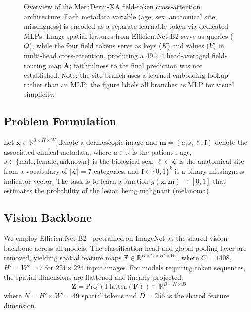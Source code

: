 \documentclass[12pt, a4paper]{article}
\newcommand{\R}{\mathbb{R}}
\begin{document}
\begin{figure}[htbp]
{%
        }
    \caption{Overview of the MetaDerm-XA field-token cross-attention architecture. Each metadata variable (age, sex, anatomical site, missingness) is encoded as a separate learnable token via dedicated MLPs. Image spatial features from EfficientNet-B2 serve as queries ($Q$), while the four field tokens serve as keys ($K$) and values ($V$) in multi-head cross-attention, producing a $49 \times 4$ head-averaged field-routing map $\bar{\mathbf{A}}$; faithfulness to the final prediction was not established. Note: the site branch uses a learned embedding lookup rather than an MLP; the figure labels all branches as MLP for visual simplicity.}
    \label{fig:architecture}
\end{figure}

\subsection{Problem Formulation}

Let $\mathbf{x} \in \R^{3 \times H \times W}$ denote a dermoscopic image and $\mathbf{m} = (a, s, \ell, \mathbf{f})$ denote the associated clinical metadata, where $a \in \R$ is the patient's age, $s \in \{\text{male}, \text{female}, \text{unknown}\}$ is the biological sex, $\ell \in \mathcal{L}$ is the anatomical site from a vocabulary of $|\mathcal{L}| = 7$ categories, and $\mathbf{f} \in \{0,1\}^k$ is a binary missingness indicator vector. The task is to learn a function $g(\mathbf{x}, \mathbf{m}) \rightarrow [0, 1]$ that estimates the probability of the lesion being malignant (melanoma).

\subsection{Vision Backbone}

We employ EfficientNet-B2~\citep{tan2019efficientnet} pretrained on ImageNet as the shared vision backbone across all models. The classification head and global pooling layer are removed, yielding spatial feature maps $\mathbf{F} \in \R^{B \times C \times H' \times W'}$, where $C = 1408$, $H' = W' = 7$ for $224 \times 224$ input images. For models requiring token sequences, the spatial dimensions are flattened and linearly projected:
\begin{equation}
    \mathbf{Z} = \text{Proj}(\text{Flatten}(\mathbf{F})) \in \R^{B \times N \times D}
\end{equation}
where $N = H' \times W' = 49$ spatial tokens and $D = 256$ is the shared feature dimension.
\end{document}
